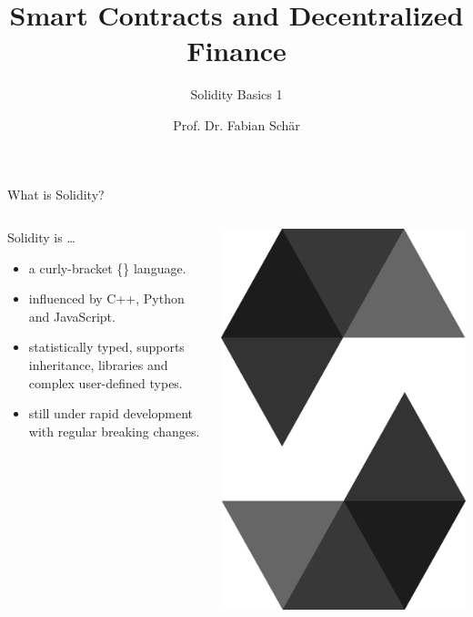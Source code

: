 \documentclass[handout]{beamer}
\title{Smart Contracts and Decentralized Finance}
\subtitle{Solidity Basics 1}
\author{Prof. Dr. Fabian Schär}
\institute{University of Basel}
\begin{document}
\thispagestyle{empty}
\begin{frame}[noframenumbering]
	\titlepage
\end{frame}

\begin{frame}{What is Solidity?}

\begin{columns}[T]
	\begin{column}{0.7\textwidth}
		Solidity is \dots
			\begin{itemize}
				\item<1-> a curly-bracket \{\} language.
				\item<2-> influenced by C++, Python and JavaScript.
				\item<3-> statistically typed, supports inheritance, libraries and complex user-defined types.
				\item<4-> still under rapid development with regular breaking changes.
			\end{itemize}
	\end{column}
	\begin{column}{0.3\textwidth}
	\center
			\includegraphics[scale=0.04]{../assets/images/solidity_logo_new}
	\end{column}
\end{columns}	


\end{frame}
\end{document}

